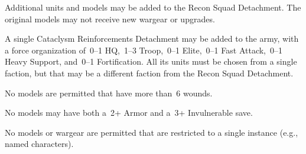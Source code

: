 \begin{columns}
\begin{squishitemize}
  \item Additional units and models may be added to the Recon Squad
    Detachment.  The original models may not receive new wargear or
    upgrades.

  \item A single Cataclysm Reinforcements Detachment may be added to
    the army, with a force organization of~0--1 HQ,~1--3 Troop,~0--1
    Elite,~0--1 Fast Attack,~0--1 Heavy Support, and~0--1
    Fortification.  All its units must be chosen from a single
    faction, but that may be a different faction from the Recon Squad
    Detachment.

  \item No models are permitted that have more than~6 wounds.

  \item No models may have both a~2+ Armor and a~3+ Invulnerable save.

  \item No models or wargear are permitted that are restricted to a
    single instance (e.g., named characters).
  \end{squishitemize}

\end{columns}


